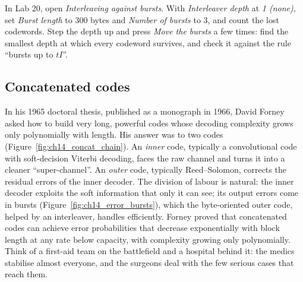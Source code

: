 \begin{tryit}
In Lab 20, open \emph{Interleaving against bursts}. With \emph{Interleaver depth} at
\emph{1 (none)}, set \emph{Burst length} to 300 bytes and \emph{Number of bursts} to 3, and count
the lost codewords. Step the depth up and press \emph{Move the bursts} a few times: find the
smallest depth at which every codeword survives, and check it against the rule ``bursts up to $tI$''.
\end{tryit}

\subsection{Concatenated codes}

In his 1965 doctoral thesis, published as a monograph in 1966, David Forney asked how to build very
long, powerful codes whose decoding complexity grows only polynomially with length. His answer was
to  two codes (Figure~\ref{fig:ch14_concat_chain}). An \emph{inner} code, typically
a convolutional code with soft-decision Viterbi decoding, faces the raw channel and turns it into a
cleaner ``super-channel''. An \emph{outer} code, typically Reed--Solomon, corrects the residual
errors of the inner decoder. The division of labour is natural: the inner decoder exploits the
soft information that only it can see; its output errors come in bursts
(Figure~\ref{fig:ch14_error_bursts}), which the byte-oriented outer code, helped by an interleaver,
handles efficiently. Forney proved that concatenated codes can achieve error probabilities that
decrease exponentially with block length at any rate below capacity, with complexity growing only
polynomially. Think of a first-aid team on the battlefield and a hospital behind it: the medics
stabilise almost everyone, and the surgeons deal with the few serious cases that reach them.

